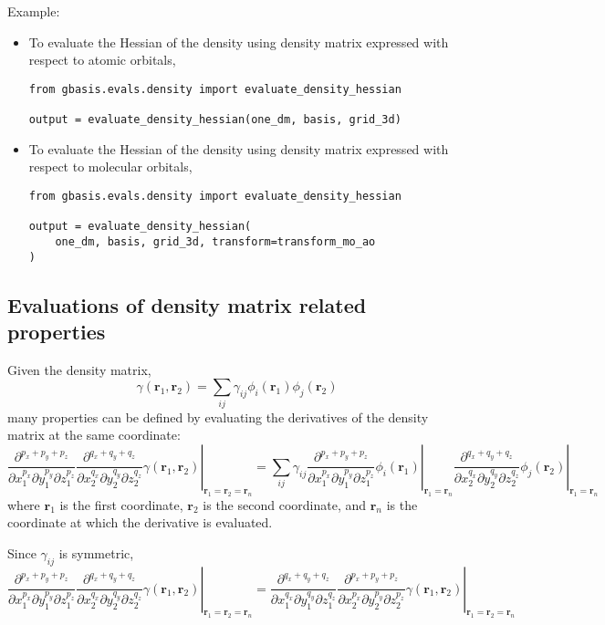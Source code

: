 \documentclass[letterpaper]{article}
\begin{document}
Example:
\begin{itemize}
\item To evaluate the Hessian of the density using density matrix expressed
  with respect to atomic orbitals,
  \begin{lstlisting}[xleftmargin=-25pt]
from gbasis.evals.density import evaluate_density_hessian

output = evaluate_density_hessian(one_dm, basis, grid_3d)
\end{lstlisting}
\item To evaluate the Hessian of the density using density matrix expressed
  with respect to molecular orbitals,
  \begin{lstlisting}[xleftmargin=-25pt]
from gbasis.evals.density import evaluate_density_hessian

output = evaluate_density_hessian(
    one_dm, basis, grid_3d, transform=transform_mo_ao
)
\end{lstlisting}
\end{itemize}
\subsection{Evaluations of density matrix related properties}
Given the density matrix,
\begin{equation}
  \gamma(\mathbf{r}_1, \mathbf{r}_2)
  = \sum_{ij} \gamma_{ij} \phi_i(\mathbf{r}_1) \phi_j(\mathbf{r}_2)
\end{equation}
many properties can be defined by evaluating the derivatives of the density
matrix at the same coordinate:
\begin{equation}
  \left.
    \frac{\partial^{p_x + p_y + p_z}}{\partial x_1^{p_x} \partial y_1^{p_y} \partial z_1^{p_z}}
    \frac{\partial^{q_x + q_y + q_z}}{\partial x_2^{q_x} \partial y_2^{q_y} \partial z_2^{q_z}}
    \gamma(\mathbf{r}_1, \mathbf{r}_2)
  \right|_{\mathbf{r}_1 = \mathbf{r}_2 = \mathbf{r}_n} =
  \sum_{ij} \gamma_{ij}
  \left.
    \frac{\partial^{p_x + p_y + p_z}}{\partial x_1^{p_x} \partial y_1^{p_y} \partial z_1^{p_z}}
    \phi_i(\mathbf{r}_1)
  \right|_{\mathbf{r}_1 = \mathbf{r}_n}
  \left.
    \frac{\partial^{q_x + q_y + q_z}}{\partial x_2^{q_x} \partial y_2^{q_y} \partial z_2^{q_z}}
    \phi_j(\mathbf{r}_2)
  \right|_{\mathbf{r}_1 = \mathbf{r}_n}
\end{equation}
where $\mathbf{r}_1$ is the first coordinate, $\mathbf{r}_2$ is the second
coordinate, and $\mathbf{r}_n$ is the coordinate at which the derivative is
evaluated.

Since $\gamma_{ij}$ is symmetric,
\begin{equation}
  \left.
    \frac{\partial^{p_x + p_y + p_z}}{\partial x_1^{p_x} \partial y_1^{p_y} \partial z_1^{p_z}}
    \frac{\partial^{q_x + q_y + q_z}}{\partial x_2^{q_x} \partial y_2^{q_y} \partial z_2^{q_z}}
    \gamma(\mathbf{r}_1, \mathbf{r}_2)
  \right|_{\mathbf{r}_1 = \mathbf{r}_2 = \mathbf{r}_n} =
  \left.
    \frac{\partial^{q_x + q_y + q_z}}{\partial x_1^{q_x} \partial y_1^{q_y} \partial z_1^{q_z}}
    \frac{\partial^{p_x + p_y + p_z}}{\partial x_2^{p_x} \partial y_2^{p_y} \partial z_2^{p_z}}
    \gamma(\mathbf{r}_1, \mathbf{r}_2)
  \right|_{\mathbf{r}_1 = \mathbf{r}_2 = \mathbf{r}_n}
\end{equation}
\end{document}
